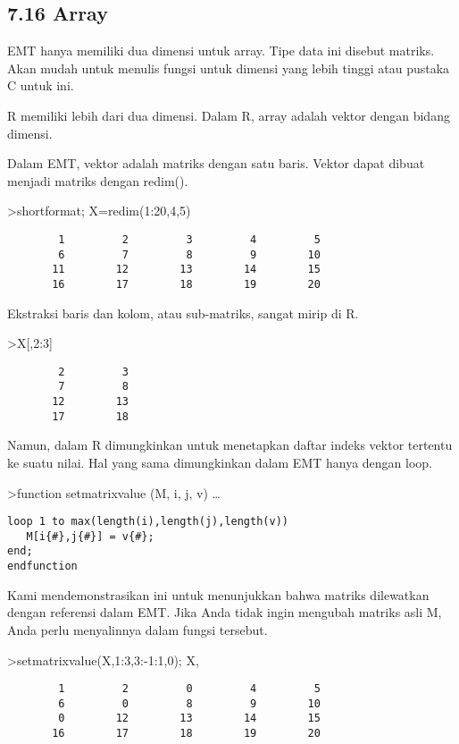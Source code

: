 \documentclass[
]{book}
\begin{document}
\subsection{7.16 Array}\label{array}

EMT hanya memiliki dua dimensi untuk array. Tipe data ini disebut matriks. Akan mudah untuk menulis fungsi untuk dimensi yang lebih tinggi atau pustaka C untuk ini.

R memiliki lebih dari dua dimensi. Dalam R, array adalah vektor dengan bidang dimensi.

Dalam EMT, vektor adalah matriks dengan satu baris. Vektor dapat dibuat menjadi matriks dengan redim().

\textgreater shortformat; X=redim(1:20,4,5)

\begin{verbatim}
        1         2         3         4         5 
        6         7         8         9        10 
       11        12        13        14        15 
       16        17        18        19        20 
\end{verbatim}

Ekstraksi baris dan kolom, atau sub-matriks, sangat mirip di R.

\textgreater X{[},2:3{]}

\begin{verbatim}
        2         3 
        7         8 
       12        13 
       17        18 
\end{verbatim}

Namun, dalam R dimungkinkan untuk menetapkan daftar indeks vektor tertentu ke suatu nilai. Hal yang sama dimungkinkan dalam EMT hanya dengan loop.

\textgreater function setmatrixvalue (M, i, j, v) \ldots{}

\begin{verbatim}
loop 1 to max(length(i),length(j),length(v))
   M[i{#},j{#}] = v{#};
end;
endfunction
\end{verbatim}

Kami mendemonstrasikan ini untuk menunjukkan bahwa matriks dilewatkan dengan referensi dalam EMT. Jika Anda tidak ingin mengubah matriks asli M, Anda perlu menyalinnya dalam fungsi tersebut.

\textgreater setmatrixvalue(X,1:3,3:-1:1,0); X,

\begin{verbatim}
        1         2         0         4         5 
        6         0         8         9        10 
        0        12        13        14        15 
       16        17        18        19        20 
\end{verbatim}
\end{document}
